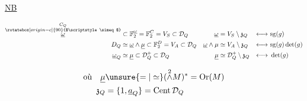 \uline{NB}

\[
\begin{aligned}
\overset{\substack{C_Q\\\rotatebox[origin=c]{90}{$\scriptstyle\simeq$}}}{\underline\omega}&\subset\mathbb F_2^{\underline\omega}=\mathbb F_2^C=V_S\subset\mathcal D_Q&
\underline\omega&=V_S\setminus\mathfrak z_Q&\longleftrightarrow&\ \mathrm{sg}(g)\\
D_Q&\simeq\underline\omega\wedge\underline\mu\subset\mathbb F_2^D=V_A\subset\mathcal D_Q&
\underline\omega\wedge\mu&\simeq V_A\setminus\mathfrak z_Q&\longleftrightarrow&\ \mathrm{sg}(g)\det(g)\\
\underline\omega_Q&\simeq\underline\mu\subset\mathcal D_Q^+\subset\mathcal D_Q&
\underline\mu&\simeq\mathcal D_Q^+\setminus\mathfrak z_Q&\longleftrightarrow&\ \det(g)
\end{aligned}
\]

\[
\begin{aligned}
\text{où}\quad \underline\mu&\unsure{=|\simeq}(\overset{2}{\wedge} M)^*=\mathrm{Or}(M)\\
\mathfrak z_Q&=\{1,\underline a_Q\}=\mathrm{Cent}\,\mathcal D_Q
\end{aligned}
\]



